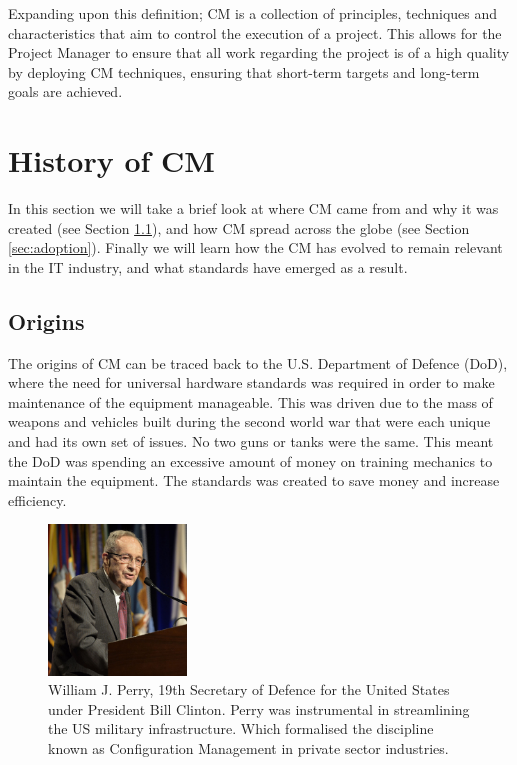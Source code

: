 \documentclass[cmpstyle]{ueacmpstyle}
\begin{document}
		Expanding upon this definition; CM is a collection of principles, techniques and characteristics that aim to control the execution of a project. This allows for the Project Manager to ensure that all work regarding the project is of a high quality by deploying CM techniques, ensuring that short-term targets and long-term goals are achieved.
	
	\section{History of CM} \label{sec:history}
	In this section we will take a brief look at where CM came from and why it was created (see Section \ref{sec:origin}), and how CM spread across the globe (see Section \ref{sec:adoption}). Finally we will learn how the CM has evolved to remain relevant in the IT industry, and what standards have emerged as a result.
	
		\subsection{Origins} \label{sec:origin}
		The origins of CM can be traced back to the U.S. Department of Defence (DoD), where the need for universal hardware standards was required in order to make maintenance of the equipment manageable. This was driven due to the mass of weapons and vehicles built during the second world war that were each unique and had its own set of issues. No two guns or tanks were the same. This meant the DoD was spending an excessive amount of money on training mechanics to maintain the equipment. The standards was created to save money and increase efficiency.
		
		\begin{figure}
			\centering
			\includegraphics[height=4cm]{images/william-perry.jpg}
			\caption{William J. Perry, 19th Secretary of Defence for the United States under President Bill Clinton. Perry was instrumental in streamlining the US military infrastructure. Which formalised the discipline known as Configuration Management in private sector industries.} \label{fig:william}
		\end{figure}
	
\end{document}
